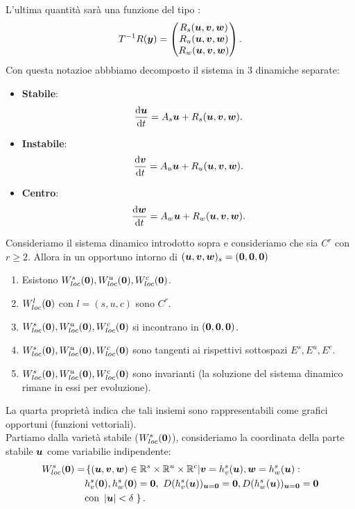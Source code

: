 L'ultima quantità sarà una funzione del tipo :
\[
    T^{-1}R(\boldsymbol{y}) = 
    \begin{pmatrix} R_{s}(\boldsymbol{u}, \boldsymbol{v}, \boldsymbol{w}) \\  R_{u}(\boldsymbol{u}, \boldsymbol{v}, \boldsymbol{w}) \\ R_{w}(\boldsymbol{u}, \boldsymbol{v}, \boldsymbol{w})\end{pmatrix}
.\] 
Con questa notazioe abbbiamo decomposto il sistema in 3 dinamiche separate:
\begin{itemize}
    \item \textbf{Stabile}:
	\[
	    \frac{\text{d} \boldsymbol{u}}{\text{d} t} = A_s \boldsymbol{u} + R_s(\boldsymbol{u}, \boldsymbol{v}, \boldsymbol{w}) 
	.\] 
    \item \textbf{Instabile}:
	\[
	    \frac{\text{d} \boldsymbol{v}}{\text{d} t} = A_u \boldsymbol{u} + R_u(\boldsymbol{u}, \boldsymbol{v}, \boldsymbol{w}) 
	.\] 
    \item \textbf{Centro}:
	\[
	    \frac{\text{d} \boldsymbol{w}}{\text{d} t} = A_w \boldsymbol{u} + R_w(\boldsymbol{u}, \boldsymbol{v}, \boldsymbol{w}) 
	.\] 
\end{itemize}
\begin{thm}
    Consideriamo il sistema dinamico introdotto sopra e consideriamo che sia $C^r$ con $r\ge 2$. Allora in un opportuno intorno di $(\boldsymbol{u}, \boldsymbol{v}, \boldsymbol{w})_s = (\boldsymbol{0}, \boldsymbol{0}, \boldsymbol{0})$
    \begin{enumerate}
	\item Esistono $W_{loc}^s(\boldsymbol{0}), W_{loc}^u(\boldsymbol{0}),W_{loc}^c(\boldsymbol{0})$.
	\item $W_{loc}^l(\boldsymbol{0})$ con $l = (s, u, c) $ sono $C^r$.
	\item $W_{loc}^s(\boldsymbol{0}), W_{loc}^u(\boldsymbol{0}),W_{loc}^c(\boldsymbol{0})$ si incontrano in $(\boldsymbol{0}, \boldsymbol{0}, \boldsymbol{0})$.
	\item $W_{loc}^s(\boldsymbol{0}), W_{loc}^u(\boldsymbol{0}),W_{loc}^c(\boldsymbol{0})$ sono tangenti ai rispettivi sottospazi $E^s, E^u, E^c$.
	\item $W_{loc}^s(\boldsymbol{0}), W_{loc}^u(\boldsymbol{0}),W_{loc}^c(\boldsymbol{0})$ sono invarianti (la soluzione del sistema dinamico rimane in essi per evoluzione).
    \end{enumerate}
\end{thm}
\noindent
La quarta proprietà indica che tali insiemi sono rappresentabili come grafici opportuni (funzioni vettoriali).\\
Partiamo dalla varietà stabile ($W_{loc}^s(\boldsymbol{0}) $), consideriamo la coordinata della parte stabile $\boldsymbol{u}$ come variabilie indipendente: 
\[\begin{aligned}
    W_{loc}^s(\v{0}) = &\left\{
	(\v{u}, \v{v}, \v{w}) \in \mathbb{R}^s \times \mathbb{R}^u \times \mathbb{R}^c |
	\v{v} = h_v^s(\v{u}), \v{w}=h_w^s(\v{u}): \right.\\
		       &
			   h_v^s(\v{0}) , h_w^s(\v{0}) = \v{0}, \ D(h_v^s(\v{u}))_{\v{u}=\v{0}} = \v{0}, 
                           D(h_w^s(\v{u}))_{\v{u}=\v{0}} = \v{0} \\
		       & \text{con } \left|\v{u}\right|< \delta
    \left. \right\}
.\end{aligned}\]
